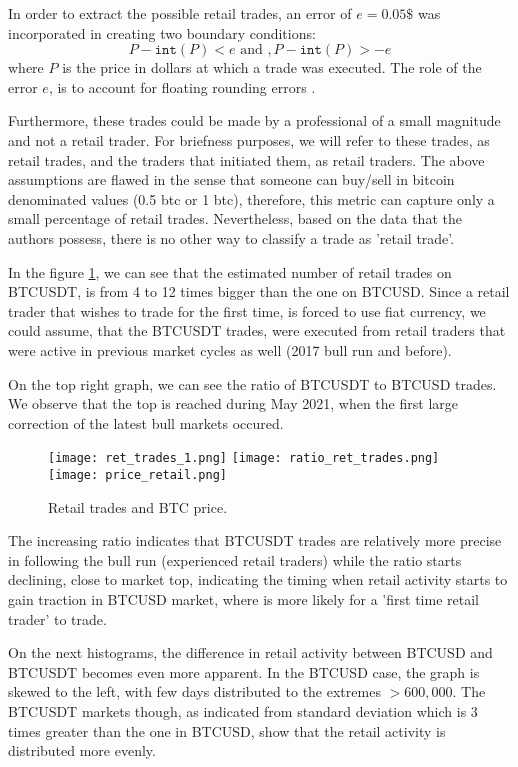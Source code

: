 In order to extract the possible retail trades, an error of \( e = 0.05\$ \) was incorporated in creating two boundary conditions: 
\[ P - \texttt{int}(P) < e \text{ and },  P - \texttt{int}(P) > -e\] 
where \( P \) is the price in dollars at which a trade was executed. The role of the error \( e \), is to account for floating rounding errors \cite{app}.   

Furthermore, these trades could be made by a professional of a small magnitude and not a retail trader. For briefness purposes, we will refer to these trades, as retail trades, and the traders that initiated them, as retail traders. The above assumptions are flawed in the sense that someone can buy/sell in bitcoin denominated  values (0.5 btc or 1 btc), therefore, this metric can capture only a small percentage of retail trades. Nevertheless, based on the data that the authors possess, there is no other way to classify a trade as 'retail trade'.
 
In the figure \ref{fig:ret1}, we can see that the estimated number of retail trades on BTCUSDT, is from 4 to 12 times bigger than the one on BTCUSD. Since a retail trader that wishes to trade for the first time, is forced to use fiat currency, we could assume, that the BTCUSDT trades, were executed from retail traders that were active in previous market cycles as well (2017 bull run and before). 

On the top right graph, we can see the ratio of BTCUSDT to BTCUSD trades. We observe that the top is reached during May 2021, when the first large correction of the latest bull markets occured. 



\begin{figure}[H]
	\centering
    \texttt{[image: ret\_trades\_1.png]}
    \texttt{[image: ratio\_ret\_trades.png]}
     \\[\smallskipamount]
    \texttt{[image: price\_retail.png]}
	\caption{Retail trades and BTC price.}
    \label{fig:ret1}
\end{figure}

The increasing ratio indicates that BTCUSDT trades are relatively more precise in following the bull run (experienced retail traders) while the ratio starts declining, close to market top, indicating the timing when retail activity starts to gain traction in BTCUSD market, where is more likely for a 'first time retail trader' to trade.

On the next histograms, the difference in retail activity between BTCUSD and BTCUSDT becomes even more apparent. In the BTCUSD case, the graph is skewed to the left, with few days distributed to the extremes \( > 600,000 \). The BTCUSDT markets though, as indicated from standard deviation which is 3 times greater than the one in BTCUSD, show that the retail activity is distributed more evenly.

